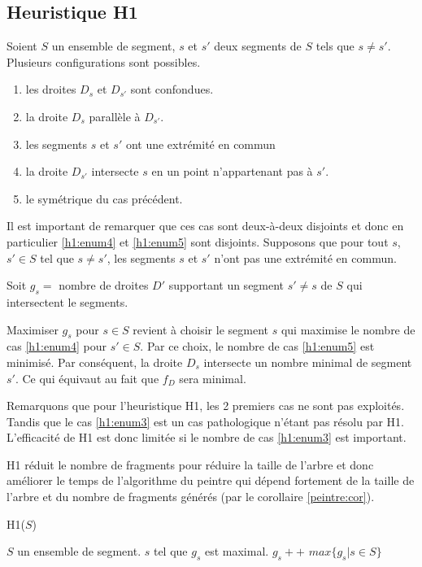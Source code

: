 \subsection{Heuristique H1}
Soient $S$ un ensemble de segment, $s$ et $s'$ deux segments
de $S$ tels que $s \ne s'$.
Plusieurs configurations sont possibles.
\begin{enumerate}
\item les droites  $D_s$ et  $D_{s'}$ sont confondues. \label{h1:enum1}
\item la droite $D_s$ parallèle à $D_{s'} $. \label{h1:enum2}
\item les segments $s$ et $s'$ ont une extrémité en commun \label{h1:enum3}
\item la droite $D_{s'}$ intersecte $s$ en un point n'appartenant pas à $s'$.\label{h1:enum4}
\item le symétrique du cas précédent. \label{h1:enum5}
\end{enumerate}

Il est important de remarquer que ces cas sont deux-à-deux disjoints
et donc en particulier \ref{h1:enum4} et \ref{h1:enum5} sont disjoints.
Supposons que pour tout $s$, $s' \in S $ tel que $s \neq s'$,
les segments $s$ et $s'$ n'ont pas une extrémité en commun.

Soit $g_s =$ nombre de droites $D'$ supportant un segment $s' \neq s$ de $S$ qui intersectent
le segments.

Maximiser $g_s$ pour $s \in S$ revient à choisir le segment $s$ qui maximise
le nombre de cas \ref{h1:enum4} pour $s' \in S$.
Par ce choix, le nombre de cas \ref{h1:enum5} est minimisé.
Par conséquent, la droite $D_s$ intersecte un nombre minimal de segment $s'$.
Ce qui équivaut au fait que $f_D$ sera minimal.


Remarquons que pour l'heuristique H1, les 2 premiers cas ne sont pas exploités.
Tandis que le cas \ref{h1:enum3} est un cas pathologique n'étant pas résolu par H1.
L'efficacité de H1 est donc limitée si le nombre de cas
\ref{h1:enum3} est important.

H1 réduit le nombre de fragments pour réduire la taille de l'arbre
et donc améliorer le temps de l'algorithme du peintre qui dépend
fortement de la taille de l'arbre et du nombre de fragments générés (par
le corollaire \ref{peintre:cor}).

\begin{algorithm}
  \caption{H1($S$)}
  \begin{algorithmic}[1] \label{algo:propvis}
    \REQUIRE $S$ un ensemble de segment.
    \ENSURE $s$ tel que $g_s$ est maximal.
    \STATE $g_s++$
    \ENDIF
    \ENDFOR
    \ENDFOR
    \RETURN $max\{g_s|s\in S\}$
  \end{algorithmic}
\end{algorithm}

